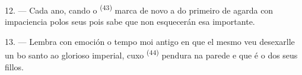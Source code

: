 12. --- Cada ano, cando o  \textsuperscript{(43)} marca de novo a
 do primeiro de  agarda con impaciencia polos seus
 pois sabe que non esquecerán esa  importante.

13. --- Lembra con emoción o tempo moi antigo en que el mesmo veu desexarlle un bo
santo ao glorioso  imperial, cuxo 
\textsuperscript{(44)} pendura na parede e que é o  dos seus fillos.
